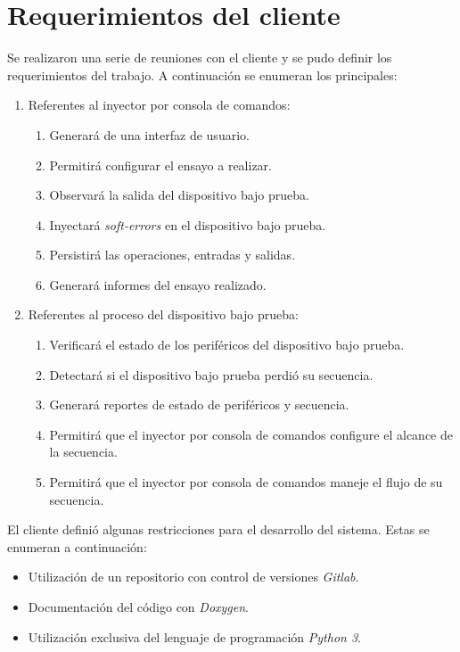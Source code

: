 \newpage

\section{Requerimientos del cliente}
\label{sec:emphuerimientos}

Se realizaron una serie de reuniones con el cliente y se pudo definir los requerimientos del trabajo.
A continuación se enumeran los principales:

\begin{enumerate}
	\item Referentes al inyector por consola de comandos:
		\begin{enumerate}
			\item Generará de una interfaz de usuario.
			\item Permitirá configurar el ensayo a realizar.
			\item Observará la salida del dispositivo bajo prueba.
            \item Inyectará \emph{soft-errors} en el dispositivo bajo prueba.
			\item Persistirá las operaciones, entradas y salidas.
			\item Generará informes del ensayo realizado.
		\end{enumerate}
	\item Referentes al proceso del dispositivo bajo prueba:
		\begin{enumerate}
			\item Verificará el estado de los periféricos del dispositivo bajo prueba.
			\item Detectará si el dispositivo bajo prueba perdió su secuencia.
			\item Generará reportes de estado de periféricos y secuencia.
			\item Permitirá que el inyector por consola de comandos configure el alcance de la secuencia.
			\item Permitirá que el inyector por consola de comandos maneje el flujo de su secuencia.
		\end{enumerate}
\end{enumerate}

El cliente definió algunas restricciones para el desarrollo del sistema.
Estas se enumeran a continuación:

\begin{itemize}
	\item Utilización de un repositorio con control de versiones \emph{Gitlab}.
	\item Documentación del código con \emph{Doxygen}.
	\item Utilización exclusiva del lenguaje de programación \emph{Python 3}.
\end{itemize}

